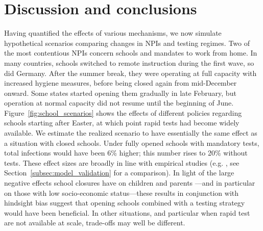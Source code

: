 \section*{Discussion and conclusions}

Having quantified the effects of various mechanisms, we now simulate hypothetical
scenarios comparing changes in NPIs and testing regimes. Two of the most contentious
NPIs concern schools and mandates to work from home.\label{ref.2.a} In many countries,
schools switched to remote instruction during the first wave, so did Germany. After the
summer break, they were operating at full capacity with increased hygiene measures,
before being closed again from mid-December onward. Some states started opening them
gradually in late February, but operation at normal capacity did not resume until the
beginning of June. Figure~\ref{fig:school_scenarios} shows the effects of different
policies regarding schools starting after Easter, at which point rapid tests had become
widely available. We estimate the realized scenario to have essentially the same effect
as a situation with closed schools. Under fully opened schools with mandatory tests,
total infections would have been 6\% higher; this number rises to 20\% without tests.
These effect sizes are broadly in line with empirical studies (e.g. \citet{Vlachos2021,
    Berger2021}, see Section~\ref{subsec:model_validation} for a comparison). In light of
the large negative effects school closures have on children and parents
\citep{Luijten2021, Melegari2021}---and in particular on those with low socio-economic
status---these results in conjunction with hindsight bias suggest that opening schools
combined with a testing strategy would have been beneficial. In other situations, and
particular when rapid test are not available at scale, trade-offs may well be different.

